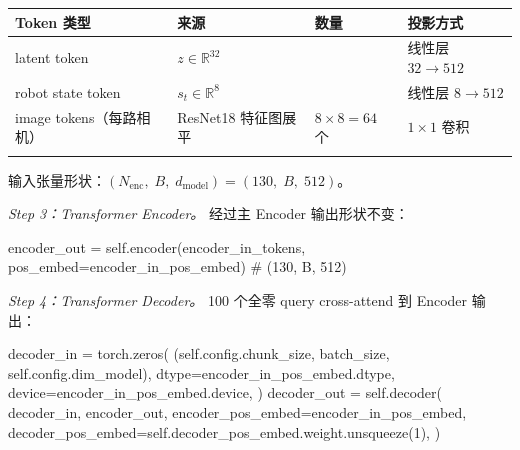 \documentclass[
  chinese,
]{ctexart}
\newenvironment{Shaded}{\begin{snugshade}}{\end{snugshade}}
\newcommand{\CommentTok}[1]{\textcolor[rgb]{0.37,0.37,0.37}{#1}}
\newcommand{\DecValTok}[1]{\textcolor[rgb]{0.68,0.00,0.00}{#1}}
\newcommand{\NormalTok}[1]{\textcolor[rgb]{0.00,0.23,0.31}{#1}}
\newcommand{\OperatorTok}[1]{\textcolor[rgb]{0.37,0.37,0.37}{#1}}
\newcommand{\VariableTok}[1]{\textcolor[rgb]{0.07,0.07,0.07}{#1}}
\begin{document}
\begin{center}
\begin{tabular}{@{}>{\raggedright\arraybackslash}p{} >{\raggedright\arraybackslash}p{} >{\raggedright\arraybackslash}p{} >{\raggedright\arraybackslash}p{}@{}}
\toprule\noalign{}
Token 类型 & 来源 & 数量 & 投影方式 \\
\midrule\noalign{}
latent token & \(z \in \mathbb{R}^{32}\) & 1 & 线性层 \(32 \to 512\) \\
robot state token & \(s_t \in \mathbb{R}^{8}\) & 1 & 线性层 \(8 \to 512\) \\
image tokens（每路相机） & ResNet18 特征图展平 & \(8 \times 8 = 64\) 个 & \(1\times1\) 卷积 \\
\bottomrule\noalign{}
\end{tabular}
\end{center}

输入张量形状：\((N_{\text{enc}},\; B,\; d_{\text{model}}) = (130,\; B,\; 512)\)。

\emph{Step 3：Transformer Encoder。} 经过主 Encoder 输出形状不变：

\begin{Shaded}
\begin{Highlighting}[]
\NormalTok{encoder\_out }\OperatorTok{=} \VariableTok{self}\NormalTok{.encoder(encoder\_in\_tokens, pos\_embed}\OperatorTok{=}\NormalTok{encoder\_in\_pos\_embed)  }\CommentTok{\# (130, B, 512)}
\end{Highlighting}
\end{Shaded}

\emph{Step 4：Transformer Decoder。} 100 个全零 query cross-attend 到
Encoder 输出：

\begin{Shaded}
\begin{Highlighting}[]
\NormalTok{        decoder\_in }\OperatorTok{=}\NormalTok{ torch.zeros(}
\NormalTok{            (}\VariableTok{self}\NormalTok{.config.chunk\_size, batch\_size, }\VariableTok{self}\NormalTok{.config.dim\_model),}
\NormalTok{            dtype}\OperatorTok{=}\NormalTok{encoder\_in\_pos\_embed.dtype,}
\NormalTok{            device}\OperatorTok{=}\NormalTok{encoder\_in\_pos\_embed.device,}
\NormalTok{        )}
\NormalTok{        decoder\_out }\OperatorTok{=} \VariableTok{self}\NormalTok{.decoder(}
\NormalTok{            decoder\_in,}
\NormalTok{            encoder\_out,}
\NormalTok{            encoder\_pos\_embed}\OperatorTok{=}\NormalTok{encoder\_in\_pos\_embed,}
\NormalTok{            decoder\_pos\_embed}\OperatorTok{=}\VariableTok{self}\NormalTok{.decoder\_pos\_embed.weight.unsqueeze(}\DecValTok{1}\NormalTok{),}
\NormalTok{        )}
\end{Highlighting}
\end{Shaded}
\end{document}
